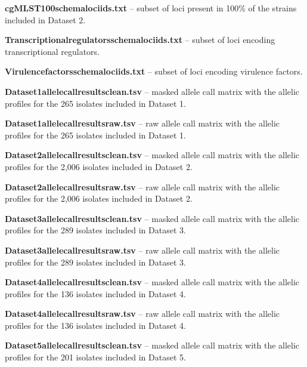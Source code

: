 \noindent \textbf{cgMLST100\textunderscore schema\textunderscore loci\textunderscore ids.txt} – subset of loci present in 100\% of the strains included in Dataset 2.

\noindent \textbf{Transcriptional\textunderscore regulators\textunderscore schema\textunderscore loci\textunderscore ids.txt} – subset of loci encoding transcriptional regulators.

\noindent \textbf{Virulence\textunderscore factors\textunderscore schema\textunderscore loci\textunderscore ids.txt} – subset of loci encoding virulence factors.

\noindent \textbf{Dataset1\textunderscore allelecall\textunderscore results\textunderscore clean.tsv} – masked allele call matrix with the allelic profiles for the 265 isolates included in Dataset 1.

\noindent \textbf{Dataset1\textunderscore allelecall\textunderscore results\textunderscore raw.tsv} – raw allele call matrix with the allelic profiles for the 265 isolates included in Dataset 1.

\noindent \textbf{Dataset2\textunderscore allelecall\textunderscore results\textunderscore clean.tsv} – masked allele call matrix with the allelic profiles for the 2,006 isolates included in Dataset 2.

\noindent \textbf{Dataset2\textunderscore allelecall\textunderscore results\textunderscore raw.tsv} – raw allele call matrix with the allelic profiles for the 2,006 isolates included in Dataset 2.

\noindent \textbf{Dataset3\textunderscore allelecall\textunderscore results\textunderscore clean.tsv} – masked allele call matrix with the allelic profiles for the 289 isolates included in Dataset 3.

\noindent \textbf{Dataset3\textunderscore allelecall\textunderscore results\textunderscore raw.tsv} – raw allele call matrix with the allelic profiles for the 289 isolates included in Dataset 3.

\noindent \textbf{Dataset4\textunderscore allelecall\textunderscore results\textunderscore clean.tsv} – masked allele call matrix with the allelic profiles for the 136 isolates included in Dataset 4.

\noindent \textbf{Dataset4\textunderscore allelecall\textunderscore results\textunderscore raw.tsv} – raw allele call matrix with the allelic profiles for the 136 isolates included in Dataset 4.

\noindent \textbf{Dataset5\textunderscore allelecall\textunderscore results\textunderscore clean.tsv} – masked allele call matrix with the allelic profiles for the 201 isolates included in Dataset 5.


